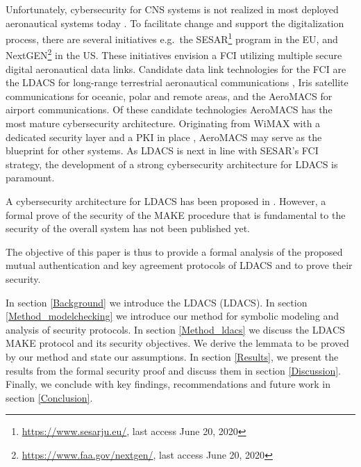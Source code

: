 Unfortunately, cybersecurity for \ac{CNS} systems is not realized in most deployed aeronautical systems today \cite{costin2012, niraula2018, yang2018}. To facilitate change and support the digitalization process, there are several initiatives e.g.\ the \ac{SESAR}\footnote{\url{https://www.sesarju.eu/}, last access June 20, 2020} program in the EU, and NextGEN\footnote{\url{https://www.faa.gov/nextgen/}, last access June 20, 2020} in the US. These initiatives envision a \ac{FCI} utilizing multiple secure digital aeronautical data links. Candidate data link technologies for the \ac{FCI} are the \ac{LDACS} for long-range terrestrial aeronautical communications \cite{schnell2019}, Iris satellite communications for oceanic, polar and remote areas, and the \ac{AeroMACS} for airport communications. Of these candidate technologies \ac{AeroMACS} has the most mature cybersecurity architecture. Originating from \ac{WiMAX} with a dedicated security layer \cite{giraudon2014} and a \ac{PKI} in place \cite{crowe2017}, \ac{AeroMACS} may serve as the blueprint for other systems. As \ac{LDACS} is next in line with \ac{SESAR}'s \ac{FCI} strategy, the development of a strong cybersecurity architecture for \ac{LDACS} is paramount.

A cybersecurity architecture for \ac{LDACS} has been proposed in \cite{maeurer20181, maeurer20182, maeurer20191, maeurer20192}. However, a formal prove of the security of the \ac{MAKE} procedure that is fundamental to the security of the overall system has not been published yet.

\vspace{0.5em}
The objective of this paper is thus to provide a formal analysis of the proposed mutual authentication and key agreement protocols of LDACS and to prove their security.

\vspace{0.5em}
In section \ref{Background} we introduce the \acl{LDACS} (\acs{LDACS}).
In section \ref{Method_modelchecking} we introduce our method for symbolic modeling and analysis of security protocols.
In section \ref{Method_ldacs} we discuss the \ac{LDACS} \ac{MAKE} protocol and its security objectives. We derive the lemmata to be proved by our method and state our assumptions.
In section \ref{Results}, we present the results from the formal security proof and discuss them in section \ref{Discussion}.
Finally, we conclude with key findings, recommendations and future work in section \ref{Conclusion}.